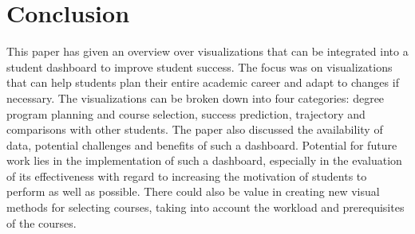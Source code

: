 \section{Conclusion}
\label{sec:conclusion}

This paper has given an overview over visualizations that can be integrated into a student dashboard to improve student success. The focus was on visualizations that can help students plan their entire academic career and adapt to changes if necessary. The visualizations can be broken down into four categories: degree program planning and course selection, success prediction, trajectory and comparisons with other students. The paper also discussed the availability of data, potential challenges and benefits of such a dashboard.
Potential for future work lies in the implementation of such a dashboard, especially in the evaluation of its effectiveness with regard to increasing the motivation of students to perform as well as possible. There could also be value in creating new visual methods for selecting courses, taking into account the workload and prerequisites of the courses.